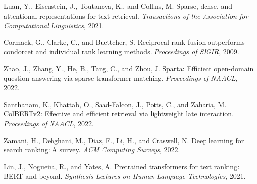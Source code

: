 \documentclass{neurips_2025}
\begin{document}
\begin{thebibliography}{99}
Luan, Y., Eisenstein, J., Toutanova, K., and Collins, M.
Sparse, dense, and attentional representations for text retrieval.
\textit{Transactions of the Association for Computational Linguistics}, 2021.

Cormack, G., Clarke, C., and Buettcher, S.
Reciprocal rank fusion outperforms condorcet and individual rank learning methods.
\textit{Proceedings of SIGIR}, 2009.

Zhao, J., Zhang, Y., He, B., Tang, C., and Zhou, J.
Sparta: Efficient open-domain question answering via sparse transformer matching.
\textit{Proceedings of NAACL}, 2022.

Santhanam, K., Khattab, O., Saad-Falcon, J., Potts, C., and Zaharia, M.
ColBERTv2: Effective and efficient retrieval via lightweight late interaction.
\textit{Proceedings of NAACL}, 2022.

Zamani, H., Dehghani, M., Diaz, F., Li, H., and Craswell, N.
Deep learning for search ranking: A survey.
\textit{ACM Computing Surveys}, 2022.

Lin, J., Nogueira, R., and Yates, A.
Pretrained transformers for text ranking: BERT and beyond.
\textit{Synthesis Lectures on Human Language Technologies}, 2021.

\end{thebibliography}
\end{document}
